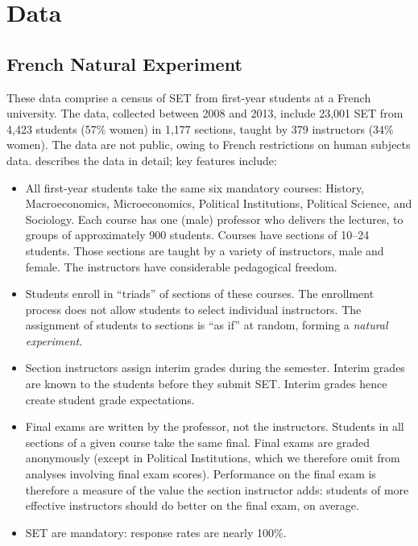 \documentclass[12pt]{article}
\begin{document}
\section{Data}
\subsection{French Natural Experiment}
These data comprise a census of SET from first-year students at a French university.
The data, collected between 2008 and 2013, include 23,001 SET from
4,423 students (57\% women) in 1,177
sections, taught by 379 instructors (34\% women). 
The data are not public, owing to French restrictions on human subjects data.
\citet{Boring2015} describes the data in detail; key features include:
\begin{itemize}
   \item All first-year students take the same six mandatory courses: 
            History, Macroeconomics, Microeconomics, 
            Political Institutions, Political Science, and Sociology.
            Each course has one (male) professor
            who delivers the lectures, to groups of approximately 900 students. 
            Courses have sections of 10--24 students. 
            Those sections are taught by a variety of instructors, male and female.
            The instructors have considerable pedagogical freedom.
    
   \item Students enroll in ``triads'' of sections of these courses. 
            The enrollment process
            does not allow students to select individual instructors.
            The assignment of students to sections is ``as if'' at random,
            forming a \emph{natural experiment}.
            
   \item Section instructors assign interim grades during the semester.
            Interim grades are known to the students before they submit SET.
            Interim grades hence create student grade expectations.
            
   \item Final exams are written by the professor, not the instructors.
            Students in all sections of a given course take the same final.
            Final exams are graded anonymously (except in Political
            Institutions, which we therefore omit from analyses involving final exam scores).
            Performance on the final exam is therefore a measure of the value the
            section instructor adds: students of more effective instructors should do better on
            the final exam, on average.
    
   \item SET are mandatory: response rates are nearly 100\%.
   
\end{itemize}
\end{document}
